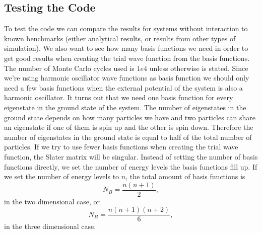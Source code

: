 \documentclass[../main.tex]{subfiles}
\begin{document}
\subsection{Testing the Code}

To test the code we can compare the results for systems without interaction to known benchmarks (either analytical results, or results from other types of simulation). We also want to see how many basis functions we need in order to get good results when creating the trial wave function from the basis functions. The number of Monte Carlo cycles used is $1e4$ unless otherwise is stated. Since we're using harmonic oscillator wave functions as basis function we should only need a few basis functions when the external potential of the system is also a harmonic oscillator. It turns out that we need one basis function for every eigenstate in the ground state of the system. The number of eigenstates in the ground state depends on how many particles we have and two particles can share an eigenstate if one of them is spin up and the other is spin down. Therefore the number of eigenstates in the ground state is equal to half of the total number of particles. If we try to use fewer basis functions when creating the trial wave function, the Slater matrix will be singular. Instead of setting the number of basis functions directly, we set the number of energy levels the basis functions fill up. If we set the number of energy levels to $n$, the total amount of basis functions is 
\begin{equation}
    N_B = \frac{n(n+1)}{2}, 
\end{equation}
in the two dimensional case, or 
\begin{equation}
    N_B = \frac{n(n+1)(n+2)}{6},
\end{equation}
in the three dimensional case.
\end{document}
